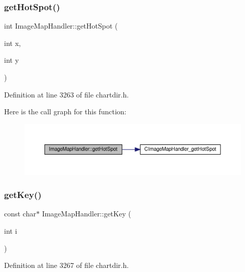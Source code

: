 \subsubsection{\texorpdfstring{get\+Hot\+Spot()}{getHotSpot()}}
{\footnotesize\ttfamily int Image\+Map\+Handler\+::get\+Hot\+Spot (\begin{DoxyParamCaption}\item[{int}]{x,  }\item[{int}]{y }\end{DoxyParamCaption})\hspace{0.3cm}{\ttfamily [inline]}}



Definition at line 3263 of file chartdir.\+h.

Here is the call graph for this function\+:
\nopagebreak
\begin{figure}[H]
\begin{center}
\leavevmode
\includegraphics[width=350pt]{class_image_map_handler_a17a681be22adb478e1355a4834fe02e1_cgraph}
\end{center}
\end{figure}
\mbox{\label{class_image_map_handler_a3c7d7c5a513b5e3fe46d11e5df99f3b1}} 
\subsubsection{\texorpdfstring{get\+Key()}{getKey()}}
{\footnotesize\ttfamily const char$\ast$ Image\+Map\+Handler\+::get\+Key (\begin{DoxyParamCaption}\item[{int}]{i }\end{DoxyParamCaption})\hspace{0.3cm}{\ttfamily [inline]}}



Definition at line 3267 of file chartdir.\+h.

